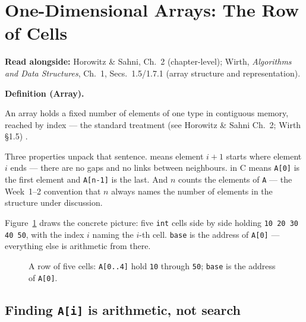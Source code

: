 \documentclass[11pt]{article}
\newenvironment{definitionbox}[1]{%
  \par\noindent\textbf{Definition (#1).}\ \itshape
}{\par\vspace{0.3em}}
\begin{document}
\section{One-Dimensional Arrays: The Row of Cells}

\textbf{Read alongside:} Horowitz \& Sahni, Ch.~2 (chapter-level); Wirth, \textit{Algorithms and Data Structures}, Ch.~1, Secs.~1.5/1.7.1 (array structure and representation).

\begin{definitionbox}{Array}
An array holds a fixed number of elements of one type in contiguous memory, reached by index --- the standard treatment (see Horowitz \& Sahni Ch.~2; Wirth \S1.5) \cite{HorowitzSahni2008_fundamentals_data_structures,Wirth2004_algorithms_data_structures}.
\end{definitionbox}

Three properties unpack that sentence.  means element $i+1$ starts where element $i$ ends --- there are no gaps and no links between neighbours.  in C means \texttt{A[0]} is the first element and \texttt{A[n-1]} is the last. And $n$ counts the elements of \texttt{A} --- the Week~1--2 convention that $n$ always names the number of elements in the structure under discussion.

Figure~\ref{fig:row5} draws the concrete picture: five \texttt{int} cells side by side holding \texttt{10 20 30 40 50}, with the index $i$ naming the $i$-th cell. \texttt{base} is the address of \texttt{A[0]} --- everything else is arithmetic from there.

\begin{figure}[h]
  \centering
  \caption{A row of five cells: \texttt{A[0..4]} hold \texttt{10} through \texttt{50}; \texttt{base} is the address of \texttt{A[0]}.}
  \label{fig:row5}
\end{figure}

\subsection{Finding \texttt{A[i]} is arithmetic, not search}
\end{document}
